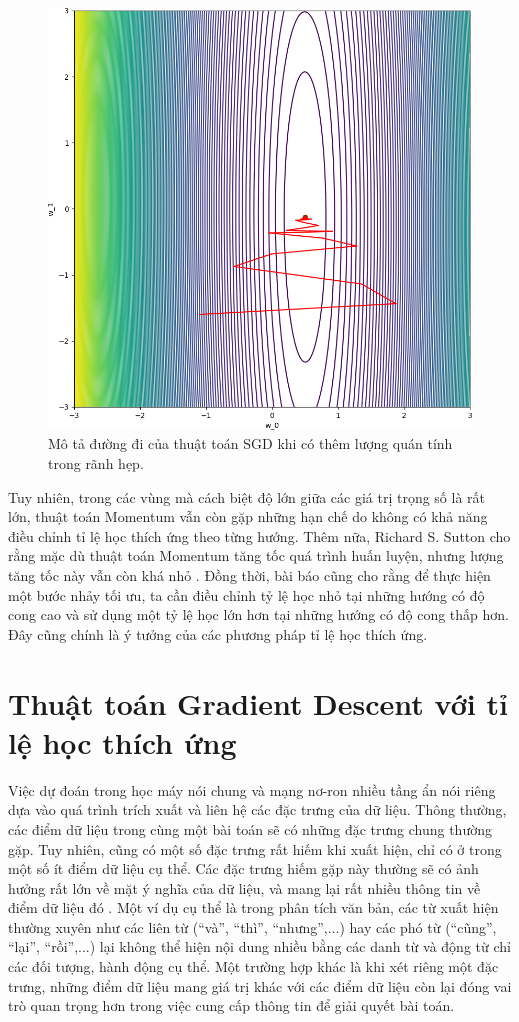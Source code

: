 \begin{figure}[htp]
	\centering
	\includegraphics[width=85 mm]{images/sgdm.png}
	\caption{Mô tả đường đi của thuật toán SGD khi có thêm lượng quán tính trong rãnh hẹp.}
	\label{fig:sgd-m}
\end{figure}

Tuy nhiên, trong các vùng mà cách biệt độ lớn giữa các giá trị trọng số là rất lớn, thuật toán Momentum vẫn còn gặp những hạn chế do không có khả năng điều chỉnh tỉ lệ học thích ứng theo từng hướng. Thêm nữa, Richard S. Sutton cho rằng mặc dù thuật toán Momentum tăng tốc quá trình huấn luyện, nhưng lượng tăng tốc này vẫn còn khá nhỏ \cite{sutton1986two}. Đồng thời, bài báo cũng cho rằng để thực hiện một bước nhảy tối ưu, ta cần điều chỉnh tỷ lệ học nhỏ tại những hướng có độ cong cao và sử dụng một tỷ lệ học lớn hơn tại những hướng có độ cong thấp hơn. Đây cũng chính là ý tưởng của các phương pháp tỉ lệ học thích ứng.

\section{Thuật toán Gradient Descent với tỉ lệ học thích ứng}

Việc dự đoán trong học máy nói chung và mạng nơ-ron nhiều tầng ẩn nói riêng dựa vào quá trình trích xuất và liên hệ các đặc trưng của dữ liệu. Thông thường, các điểm dữ liệu trong cùng một bài toán sẽ có những đặc trưng chung thường gặp. Tuy nhiên, cũng có một số đặc trưng rất hiếm khi xuất hiện, chỉ có ở trong một số ít điểm dữ liệu cụ thể. Các đặc trưng hiếm gặp này thường sẽ có ảnh hưởng rất lớn về mặt ý nghĩa của dữ liệu, và mang lại rất nhiều thông tin về điểm dữ liệu đó \cite{salton1988term}. Một ví dụ cụ thể là trong phân tích văn bản, các từ xuất hiện thường xuyên như các liên từ (``và'', ``thì'', ``nhưng'',...) hay các phó từ (``cũng'', ``lại'', ``rồi'',...) lại không thể hiện nội dung nhiều bằng các danh từ và động từ chỉ các đối tượng, hành động cụ thể. Một trường hợp khác là khi xét riêng một đặc trưng, những điểm dữ liệu mang giá trị khác với các điểm dữ liệu còn lại đóng vai trò quan trọng hơn trong việc cung cấp thông tin để giải quyết bài toán.

